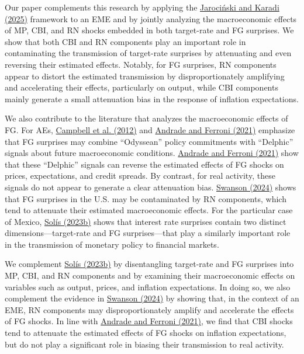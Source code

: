 \documentclass[12pt, reqno]{article}
\begin{document}
Our paper complements this research by applying the \hyperlink{Jarociński and Karadi (2025)}{Jarociński and Karadi (2025)} framework to an EME and by jointly analyzing the macroeconomic effects of MP, CBI, and RN shocks embedded in both target-rate and FG surprises. We show that both CBI and RN components play an important role in contaminating the transmission of target-rate surprises by attenuating and even reversing their estimated effects. Notably, for FG surprises, RN components appear to distort the estimated transmission by disproportionately amplifying and accelerating their effects, particularly on output, while CBI components mainly generate a small attenuation bias in the response of inflation expectations.



We also contribute to the literature that analyzes the macroeconomic effects of FG. For AEs, \hyperlink{Campbell et al. (2012)}{Campbell et al. (2012)} and \hyperlink{Andrade and Ferroni (2021)}{Andrade and Ferroni (2021)} emphasize that FG surprises may combine “Odyssean” policy commitments with “Delphic” signals about future macroeconomic conditions. \hyperlink{Andrade and Ferroni (2021)}{Andrade and Ferroni (2021)} show that these “Delphic” signals can reverse the estimated effects of FG shocks on prices, expectations, and credit spreads. By contrast, for real activity, these signals do not appear to generate a clear attenuation bias. \hyperlink{Swanson (2024)}{Swanson (2024)} shows that FG surprises in the U.S. may be contaminated by RN components, which tend to attenuate their estimated macroeconomic effects. For the particular case of Mexico, \hyperlink{Solis (2023b)}{Solís (2023b)} shows that interest rate surprises contain two distinct dimensions—target-rate and FG surprises—that play a similarly important role in the transmission of monetary policy to financial markets. 

We complement \hyperlink{Solis (2023b)}{Solís (2023b)} by disentangling target-rate and FG surprises into MP, CBI, and RN components and by examining their macroeconomic effects on variables such as output, prices, and inflation expectations. In doing so, we also complement the evidence in \hyperlink{Swanson (2024)}{Swanson (2024)} by showing that, in the context of an EME, RN components may disproportionately amplify and accelerate the effects of FG shocks. In line with \hyperlink{Andrade and Ferroni (2021)}{Andrade and Ferroni (2021)}, we find that CBI shocks tend to attenuate the estimated effects of FG shocks on inflation expectations, but do not play a significant role in biasing their transmission to real activity.
\end{document}
